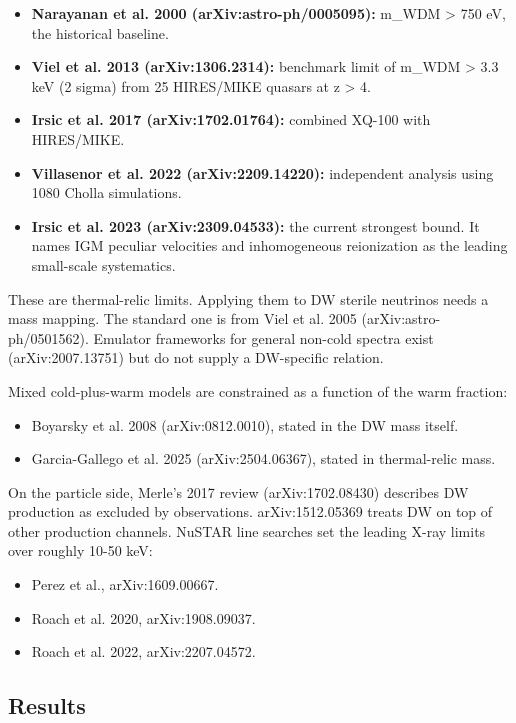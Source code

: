 \documentclass[11pt,a4paper]{article}
\begin{document}
\begin{itemize}
  \item \textbf{Narayanan et al. 2000 (arXiv:astro-ph/0005095):} m\_WDM \textgreater{} 750 eV, the historical baseline.
  \item \textbf{Viel et al. 2013 (arXiv:1306.2314):} benchmark limit of m\_WDM \textgreater{} 3.3 keV (2 sigma) from 25 HIRES/MIKE quasars at z \textgreater{} 4.
  \item \textbf{Irsic et al. 2017 (arXiv:1702.01764):} combined XQ-100 with HIRES/MIKE.
  \item \textbf{Villasenor et al. 2022 (arXiv:2209.14220):} independent analysis using 1080 Cholla simulations.
  \item \textbf{Irsic et al. 2023 (arXiv:2309.04533):} the current strongest bound. It names IGM peculiar velocities and inhomogeneous reionization as the leading small-scale systematics.
\end{itemize}
These are thermal-relic limits. Applying them to DW sterile neutrinos needs a mass mapping. The standard one is from Viel et al. 2005 (arXiv:astro-ph/0501562). Emulator frameworks for general non-cold spectra exist (arXiv:2007.13751) but do not supply a DW-specific relation.

Mixed cold-plus-warm models are constrained as a function of the warm fraction:

\begin{itemize}
  \item Boyarsky et al. 2008 (arXiv:0812.0010), stated in the DW mass itself.
  \item Garcia-Gallego et al. 2025 (arXiv:2504.06367), stated in thermal-relic mass.
\end{itemize}
On the particle side, Merle's 2017 review (arXiv:1702.08430) describes DW production as excluded by observations. arXiv:1512.05369 treats DW on top of other production channels. NuSTAR line searches set the leading X-ray limits over roughly 10-50 keV:

\begin{itemize}
  \item Perez et al., arXiv:1609.00667.
  \item Roach et al. 2020, arXiv:1908.09037.
  \item Roach et al. 2022, arXiv:2207.04572.
\end{itemize}
\subsection{Results}
\end{document}
